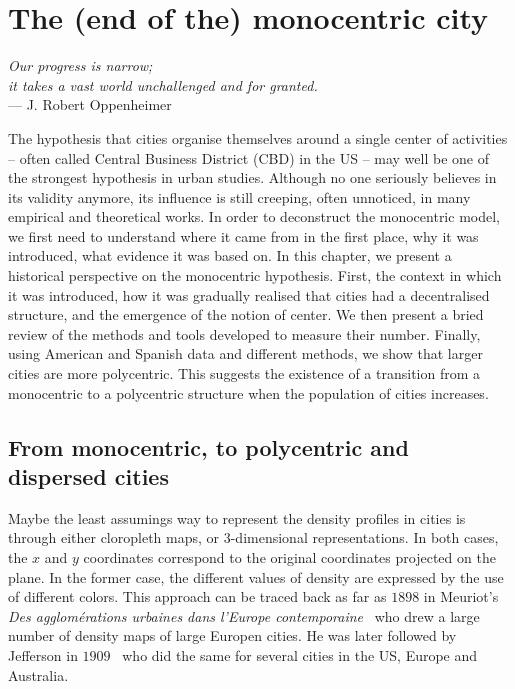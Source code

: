 %
\chapter{The (end of the) monocentric city}
\label{chap:monocentric_introduction}

\begin{flushright}{\slshape    
Our progress is narrow;\\
it takes a vast world unchallenged and for granted.}  \\ \medskip
--- J. Robert Oppenheimer~\cite{Oppenheimer:1954}
\end{flushright}


\bigskip


The hypothesis that cities organise themselves around a single center of
activities -- often called Central Business District (CBD) in the US -- may well
be one of the strongest hypothesis in urban studies. Although no one seriously
believes in its validity anymore, its influence is still creeping, often
unnoticed, in many empirical and theoretical works.  In order to deconstruct the
monocentric model, we first need to understand where it came from in the first
place, why it was introduced, what evidence it was based on. In this chapter, we
present a historical perspective on the monocentric hypothesis. First, the
context in which it was introduced,  how it was gradually realised that cities
had a decentralised structure, and the emergence of the notion of center. We
then present a bried review of the methods and tools developed to measure their
number. Finally, using American and Spanish data and different methods, we show
that larger cities are more polycentric. This suggests the existence of a
transition from a monocentric to a polycentric structure when the population of
cities increases.

\section{From monocentric, to polycentric and dispersed cities}
\label{sec:introduction}

Maybe the least assumings way to represent the density profiles in cities is
through either cloropleth maps, or 3-dimensional representations. In both cases,
the $x$ and $y$ coordinates correspond to the original coordinates projected on
the plane. In the former case, the different values of density are expressed by
the use of different colors. This approach can be traced back as far as $1898$
in Meuriot's \emph{Des agglom\'erations urbaines dans l'Europe
contemporaine}~\cite{Meuriot:1898} who drew a large number of density maps of
large Europen cities. He was later followed by Jefferson in
$1909$~\cite{Jefferson:1909} who did the same for several cities in the US,
Europe and Australia.\\


